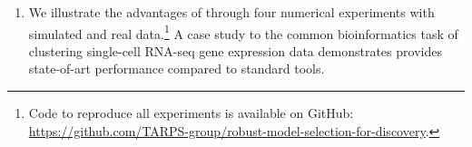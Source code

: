 \begin{enumerate}
	\item We illustrate the advantages of \methodname through four numerical experiments with 
	    simulated and real data.\footnote{Code to reproduce all experiments is available on GitHub: \url{https://github.com/TARPS-group/robust-model-selection-for-discovery}.} %
	    A case study to the common bioinformatics task of clustering single-cell RNA-seq gene expression data
        demonstrates \methodname provides state-of-art performance
        compared to standard tools. 
\end{enumerate}






